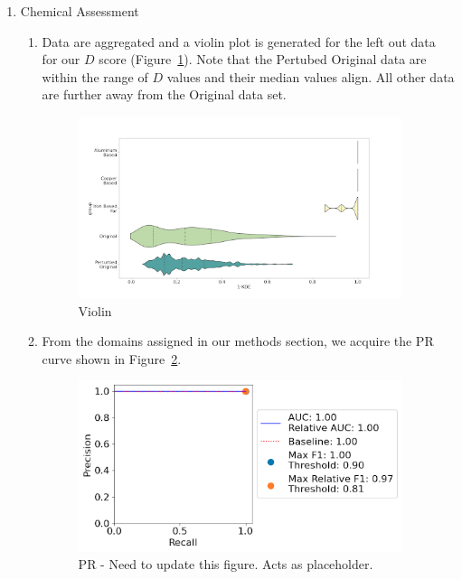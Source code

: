 \begin{enumerate}
    
    \item Chemical Assessment

    \begin{enumerate}

        \item Data are aggregated and a violin plot is generated for the left out data for our $D$ score (Figure~\ref{fluence_chemical}). Note that the Pertubed Original data are within the range of $D$ values and their median values align. All other data are further away from the Original data set.

        \begin{figure}[H]
        \centering
        \includegraphics[width=0.95\textwidth]{figures/fluence_chemical.png}
        \caption{Violin}
        \label{fluence_chemical}
        \end{figure}

        \item From the domains assigned in our methods section, we acquire the PR curve shown in Figure~\ref{fluence_chemical_pr}.

        \begin{figure}[H]
        \centering
        \includegraphics[width=0.95\textwidth]{figures/fluence_chemical_pr.png}
        \caption{PR - Need to update this figure. Acts as placeholder.}
        \label{fluence_chemical_pr}
        \end{figure}
        

\end{enumerate}
\end{enumerate}
